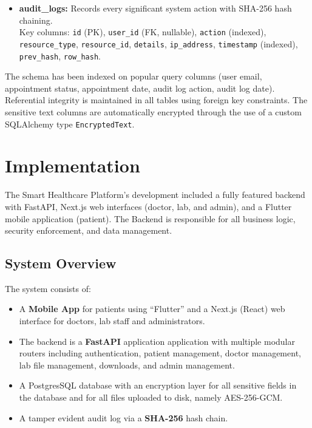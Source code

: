 \documentclass[a4paper,12pt]{report}
\begin{document}
\begin{itemize}
    \item \textbf{audit\_logs:} Records every significant system action with SHA-256 hash chaining. \\
    Key columns: \texttt{id} (PK), \texttt{user\_id} (FK, nullable), \texttt{action} (indexed), \texttt{resource\_type}, \texttt{resource\_id}, \texttt{details}, \texttt{ip\_address}, \texttt{timestamp} (indexed), \texttt{prev\_hash}, \texttt{row\_hash}.
\end{itemize}

The schema has been indexed on popular query columns (user email, appointment status, appointment date, audit log action, audit log date). Referential integrity is maintained in all tables using foreign key constraints. The sensitive text columns are automatically encrypted through the use of a custom SQLAlchemy type \texttt{EncryptedText}.


\chapter{Implementation}

The Smart Healthcare Platform's development included a fully featured backend with FastAPI, Next.js web interfaces (doctor, lab, and admin), and a Flutter mobile application (patient). The Backend is responsible for all business logic, security enforcement, and data management.

\section{System Overview}

The system consists of:

\begin{itemize}
    \item A \textbf{Mobile App} for patients using “Flutter” and a Next.js (React) web interface for doctors, lab staff and administrators.
    \item The backend is a \textbf{FastAPI} application application with multiple modular routers including authentication, patient management, doctor management, lab file management, downloads, and admin management.
    \item A PostgresSQL database with an encryption layer for all sensitive fields in the database and for all files uploaded to disk, namely AES-256-GCM.
    \item A tamper evident audit log via a \textbf{SHA-256} hash chain.
\end{itemize}
\end{document}
